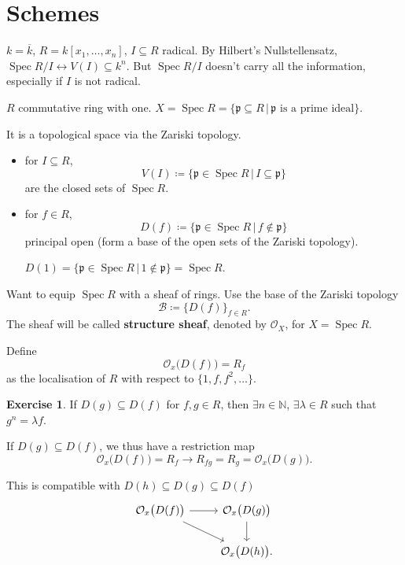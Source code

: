 \documentclass[12pt]{article}
\DeclareMathOperator{\Spec}{Spec}
\theoremstyle{definition}
\newtheorem*{exercise}{Exercise}
\begin{document}
\section{Schemes}
$k=\overline k$, $R=k[x_1,\ldots,x_n]$, $I\subseteq R$ radical. By Hilbert's Nullstellensatz, $\Spec R/I\leftrightarrow V(I)\subseteq k^n$. But $\Spec R/I$ doesn't carry all the information, especially if $I$ is not radical.

$R$ commutative ring with one. $X=\Spec R=\{\mathfrak p\subseteq R\,|\,\mathfrak p\text{ is a prime ideal}\}$.

It is a topological space via the Zariski topology.

\begin{itemize}
\item for $I\subseteq R$,
\[V(I)\coloneqq\{\mathfrak p\in\Spec R\,|\,I\subseteq\mathfrak p\}\]
are the closed sets of $\Spec R$.

\item for $f\in R$,
\[D(f)\coloneqq\{\mathfrak p\in\Spec R\,|\,f\notin\mathfrak p\}\]
principal open (form a base of the open sets of the Zariski topology).

$D(1)=\{\mathfrak p\in\Spec R\,|\,1\notin\mathfrak p\}=\Spec R$.
\end{itemize}

Want to equip $\Spec R$ with a sheaf of rings. Use the base of the Zariski topology
\[\mathcal B\coloneqq\big\{D(f)\big\}_{f\in R}.\]
The sheaf will be called \textbf{structure sheaf}, denoted by $\mathcal O_X$, for $X=\Spec R$.

Define
\[\mathcal O_x\big(D(f)\big)=R_f\]
as the localisation of $R$ with respect to $\{1,f,f^2,\ldots\}$.

\begin{exercise}
If $D(g)\subseteq D(f)$ for $f,g\in R$, then $\exists n\in\mathbb N$, $\exists\lambda\in R$ such that $g^n=\lambda f$.
\end{exercise}

If $D(g)\subseteq D(f)$, we thus have a restriction map
\[\mathcal O_x\big(D(f)\big)=R_f\longrightarrow R_{fg}=R_g=\mathcal O_x\big(D(g)\big).\]

This is compatible with $D(h)\subseteq D(g)\subseteq D(f)$
\[\begin{tikzcd}\mathcal O_x\big(D(f)\big)\arrow[r]\arrow[rd]&\mathcal O_x\big(D(g)\big)\arrow[d]\\&\mathcal O_x\big(D(h)\big).\end{tikzcd}\]
\end{document}
